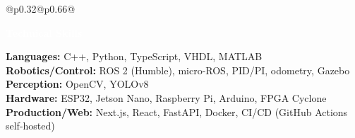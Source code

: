 \documentclass[10pt,letterpaper]{article}
\newcommand{\smalltext}[1]{\small #1}
\newcommand{\sectionbar}[1]{\colorbox{accent}{\parbox{\dimexpr\linewidth-2\fboxsep}{\textcolor{white}{\bfseries #1}}}}
\begin{document}
\begin{tabularx}{\textwidth}{@{}p{0.32\textwidth}@{\hspace{0.02\textwidth}}p{0.66\textwidth}@{}}
\begin{minipage}[t]{\linewidth}
\sectionbar{Technical Skills}
\smalltext{\textbf{Languages:} C++, Python, TypeScript, VHDL, MATLAB}\\
\smalltext{\textbf{Robotics/Control:} ROS 2 (Humble), micro-ROS, PID/PI, odometry, Gazebo}\\
\smalltext{\textbf{Perception:} OpenCV, YOLOv8}\\
\smalltext{\textbf{Hardware:} ESP32, Jetson Nano, Raspberry Pi, Arduino, FPGA Cyclone}\\
\smalltext{\textbf{Production/Web:} Next.js, React, FastAPI, Docker, CI/CD (GitHub Actions self-hosted)}

\end{minipage}
\end{tabularx}
\end{document}
